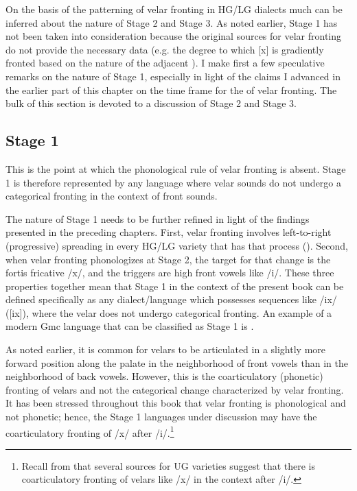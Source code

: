 On the basis of the patterning of velar fronting in HG/LG dialects much can be inferred about the nature of Stage 2 and Stage 3. As noted earlier, Stage 1 has not been taken into consideration because the original sources for velar fronting do not provide the necessary data (e.g. the degree to which [x] is gradiently fronted based on the nature of the adjacent ). I make first a few speculative remarks on the nature of Stage 1, especially in light of the claims I advanced in the earlier part of this chapter on the time frame for the  of velar fronting. The bulk of this section is devoted to a discussion of Stage 2 and Stage 3.

\subsection{Stage 1}
  This is the point at which the phonological rule of velar fronting is absent. Stage 1 is therefore represented by any language where velar sounds do not undergo a categorical fronting in the context of front sounds.

  The nature of Stage 1 needs to be further refined in light of the findings presented in the preceding chapters. First, velar fronting involves left-to-right (progressive) spreading in every HG/LG variety that has that process (). Second, when velar fronting phonologizes at Stage 2, the target for that change is the fortis fricative /x/, and the triggers are high front vowels like /i/. These three properties together mean that Stage 1 in the context of the present book can be defined specifically as any dialect/language which possesses sequences like /ix/ ([ix]), where the velar does not undergo categorical fronting. An example of a modern Gmc language that can be classified as Stage 1 is .

  As noted earlier, it is common for velars to be articulated in a slightly more forward position along the palate in the neighborhood of front vowels than in the neighborhood of back vowels. However, this is the coarticulatory (phonetic) fronting of velars and not the categorical change characterized by velar fronting. It has been stressed throughout this book that velar fronting is phonological and not phonetic; hence, the Stage 1 languages under discussion may have the coarticulatory fronting of /x/ after /i/.\footnote{{Recall from  that several sources for UG varieties suggest that there is coarticulatory fronting of velars like /x/ in the context after /i/.}}

